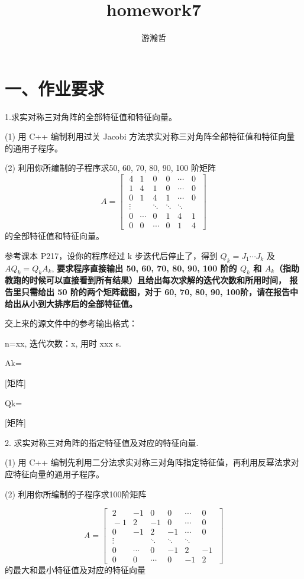 \documentclass{article}
\title{homework7}
\author{游瀚哲}
\begin{document}
\maketitle

\section*{一、作业要求}
1.求实对称三对角阵的全部特征值和特征向量。

(1) 用 C++ 编制利用过关 Jacobi 方法求实对称三对角阵全部特征值和特征向量的通用子程序。

(2) 利用你所编制的子程序求50, 60, 70, 80, 90, 100 阶矩阵
$$
A=\begin{bmatrix}
\;4 & 1 & 0 & 0 & \cdots & 0 \;\\
\;1 & 4 & 1 & 0 & \cdots & 0 \;\\
\;0 & 1 & 4 & 1 & \cdots & 0 \;\\
\;\vdots & & \ddots & \ddots & \ddots \;\\
\;0 & \cdots & 0 & 1 & 4 & 1\;\\
\;0 & 0 & \cdots & 0 & 1 & 4\; 
\end{bmatrix}
$$
的全部特征值和特征向量。

参考课本 P217，设你的程序经过 k 步迭代后停止了，得到 $Q_k = J_1 \cdots J_k$ 及 $AQ_k = Q_kA_k$,
\textbf{要求程序直接输出 50, 60, 70, 80, 90, 100 阶的 $Q_k$ 和 $A_k$（指助教跑的时候可以直接看到所有结果）且给出每次求解的迭代次数和所用时间，
报告里只需给出 50 阶的两个矩阵截图，对于 60, 70, 80, 90, 100阶，请在报告中给出从小到大排序后的全部特征值。}

交上来的源文件中的参考输出格式：

n=xx, 迭代次数：x, 用时 xxx s.

Ak=

[矩阵]

Qk=

[矩阵]



2. 求实对称三对角阵的指定特征值及对应的特征向量.

(1) 用 C++ 编制先利用二分法求实对称三对角阵指定特征值，再利用反幂法求对应特征向量的通用子程序。

(2) 利用你所编制的子程序求100阶矩阵

$$
A=\begin{bmatrix}
\;2 & -1 & 0 & 0 & \cdots & 0 \;\\
\;-1 & 2 & -1 & 0 & \cdots & 0 \;\\
\;0 & -1 & 2 & -1 & \cdots & 0 \;\\
\;\vdots & & \ddots & \ddots & \ddots \;\\
\;0 & \cdots & 0 & -1 & 2 & -1\;\\
\;0 & 0 & \cdots & 0 & -1 & 2\; 
\end{bmatrix}
$$
的最大和最小特征值及对应的特征向量
\end{document}
